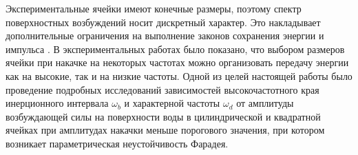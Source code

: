 





Экспериментальные ячейки имеют конечные размеры, поэтому спектр поверхностных возбуждений носит дискретный характер. Это накладывает дополнительные ограничения на выполнение законов сохранения энергии и импульса \cite{Kartashova1991}. В экспериментальных работах \cite{Brazhnikov2014, Aburakhimov2015} было показано, что выбором размеров ячейки при накачке на некоторых частотах можно организовать передачу энергии как на высокие, так и на низкие частоты.
Одной из целей настоящей работы было проведение подробных исследований зависимостей высокочастотного края инерционного интервала $\omega_b$ и характерной частоты $\omega_d$ от амплитуды возбуждающей силы на поверхности воды в цилиндрической и квадратной ячейках при амплитудах накачки меньше порогового значения, при котором возникает параметрическая неустойчивость Фарадея.

